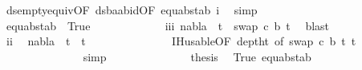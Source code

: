\begin{isabellebody}
\ ds{\isacharunderscore}{\kern0pt}empty{\isacharunderscore}{\kern0pt}equiv{\isacharunderscore}{\kern0pt}{}{\isacharbrackleft}{\kern0pt}OF\ ds{\isacharunderscore}{\kern0pt}baab{\isacharunderscore}{\kern0pt}id{\isacharbrackleft}{\kern0pt}OF\ equ{\isacharunderscore}{\kern0pt}abst{\isacharunderscore}{\kern0pt}ab{\isacharparenleft}{\kern0pt}{}{\isacharparenright}{\kern0pt}{\isacharbrackright}{\kern0pt}\ i{\isacharbrackright}{\kern0pt}\ \isamarkupfalse%
\ simp\isanewline
\ \ \ \ \ \ \ \ \ \ \ \isamarkupfalse%
\ equ{\isacharunderscore}{\kern0pt}abst{\isacharunderscore}{\kern0pt}ab\ {}\ True\isanewline
\ \ \ \ \ \ \ \ \ \ \ \isamarkupfalse%
\ iii{\isacharcolon}{\kern0pt}\ {\isachardoublequoteopen}nabla\ {\isasymturnstile}\ t{}{\isacharprime}{\kern0pt}\ {\isasymapprox}\ swap\ {\isacharbrackleft}{\kern0pt}{\isacharparenleft}{\kern0pt}c{\isacharcomma}{\kern0pt}\ b{\isacharparenright}{\kern0pt}{\isacharbrackright}{\kern0pt}\ t{}{\isacharprime}{\kern0pt}{\isachardoublequoteclose}\ \isamarkupfalse%
\ blast\isanewline
\ \ \ \ \ \ \ \ \ \ \ \isamarkupfalse%
\ ii\ \isamarkupfalse%
\ {\isachardoublequoteopen}nabla\ {\isasymturnstile}\ t{}{\isacharprime}{\kern0pt}\ {\isasymapprox}\ t{}{\isacharprime}{\kern0pt}{\isachardoublequoteclose}\isanewline
\ \ \ \ \ \ \ \ \ \ \ \ \ \isamarkupfalse%
\ IH{\isacharunderscore}{\kern0pt}usable{\isacharbrackleft}{\kern0pt}OF\ deptht{}{\isacharcomma}{\kern0pt}\ of\ {\isacartoucheopen}swap\ {\isacharbrackleft}{\kern0pt}{\isacharparenleft}{\kern0pt}c{\isacharcomma}{\kern0pt}\ b{\isacharparenright}{\kern0pt}{\isacharbrackright}{\kern0pt}\ t{}{\isacharprime}{\kern0pt}{\isacartoucheclose}\ t{}{\isacharprime}{\kern0pt}{\isacharbrackright}{\kern0pt}\ {}{\isacharparenleft}{\kern0pt}{}{\isacharparenright}{\kern0pt}\isanewline
\ \ \ \ \ \ \ \ \ \ \ \ \ \isamarkupfalse%
\ simp\isanewline
\ \ \ \ \ \ \ \ \ \ \ \isamarkupfalse%
\ \isamarkupfalse%
\ {\isacharquery}{\kern0pt}thesis\ \isamarkupfalse%
\ True\ equ{\isacharunderscore}{\kern0pt}abst{\isacharunderscore}{\kern0pt}ab{\isacharparenleft}{\kern0pt}{}{\isacharparenright}{\kern0pt}\ {}{\isacharparenleft}{\kern0pt}{}{\isacharcomma}{\kern0pt}{}{\isacharparenright}{\kern0pt}\ \isamarkupfalse%

\end{isabellebody}
